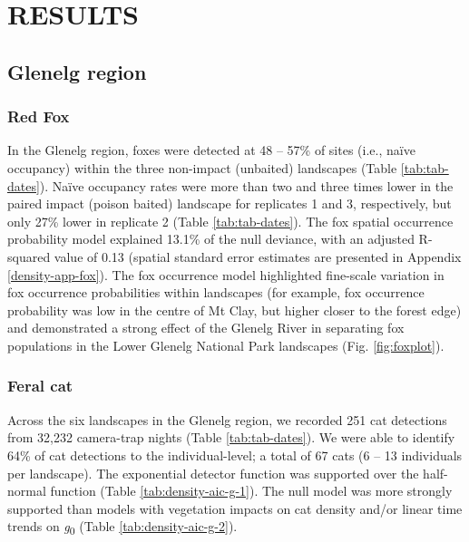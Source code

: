 \documentclass[preprint, 3p, authoryear]{elsarticle} %
\begin{document}
\newpage

\hypertarget{results}{%
\section{RESULTS}\label{results}}

\hypertarget{glenelg-region}{%
\subsection{Glenelg region}\label{glenelg-region}}

\hypertarget{red-fox}{%
\subsubsection{Red Fox}\label{red-fox}}

In the Glenelg region, foxes were detected at 48 -- 57\% of sites (i.e., naïve occupancy) within the three non-impact (unbaited) landscapes (Table \ref{tab:tab-dates}). Naïve occupancy rates were more than two and three times lower in the paired impact (poison baited) landscape for replicates 1 and 3, respectively, but only 27\% lower in replicate 2 (Table \ref{tab:tab-dates}). The fox spatial occurrence probability model explained 13.1\% of the null deviance, with an adjusted R-squared value of 0.13 (spatial standard error estimates are presented in Appendix \ref{density-app-fox}). The fox occurrence model highlighted fine-scale variation in fox occurrence probabilities within landscapes (for example, fox occurrence probability was low in the centre of Mt Clay, but higher closer to the forest edge) and demonstrated a strong effect of the Glenelg River in separating fox populations in the Lower Glenelg National Park landscapes (Fig. \ref{fig:foxplot}).

\hypertarget{feral-cat}{%
\subsubsection{Feral cat}\label{feral-cat}}

Across the six landscapes in the Glenelg region, we recorded 251 cat detections from 32,232 camera-trap nights (Table \ref{tab:tab-dates}). We were able to identify 64\% of cat detections to the individual-level; a total of 67 cats (6 -- 13 individuals per landscape). The exponential detector function was supported over the half-normal function (Table \ref{tab:density-aic-g-1}). The null model was more strongly supported than models with vegetation impacts on cat density and/or linear time trends on \emph{g}\textsubscript{0} (Table \ref{tab:density-aic-g-2}).
\end{document}
